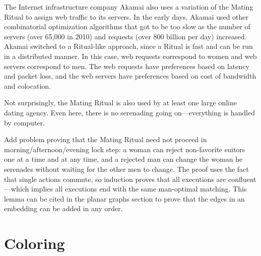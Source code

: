 The Internet infrastructure company Akamai also uses a variation of
the Mating Ritual to assign web traffic to its servers.  In the early
days, Akamai used other combinatorial optimization algorithms that got
to be too slow as the number of servers (over 65,000 in 2010) and
requests (over 800 billion per day) increased.  Akamai switched to a
Ritual-like approach, since a Ritual is fast and can be run in a distributed
manner.  In this case, web requests correspond to women and web
servers correspond to men.  The web requests have preferences based on
latency and packet loss, and the web servers have preferences based on
cost of bandwidth and colocation.

Not surprisingly, the Mating Ritual is also used by at least one large
online dating agency.  Even here, there is no serenading going
on---everything is handled by computer.

\begin{problems}

\practiceproblems
{}

\classproblems

\homeworkproblems
{}

\examproblems
{}

\begin{editingnotes}
\begin{problem*}
Add problem proving that the Mating Ritual need not proceed in
morning/afternoon/evening lock step: a woman can reject non-favorite
suitors one at a time and at any time, and a rejected man can change
the woman he serenades without waiting for the other men to change.
The proof uses the fact that single actions commute, so induction
proves that all executions are confluent---which implies all
executions end with the same man-optimal matching.  This lemma can be
cited in the planar graphs section to prove that the edges in an
embedding can be added in any order.
\end{problem*}
\end{editingnotes}

\end{problems}


\section{Coloring}\label{sec:coloring}


